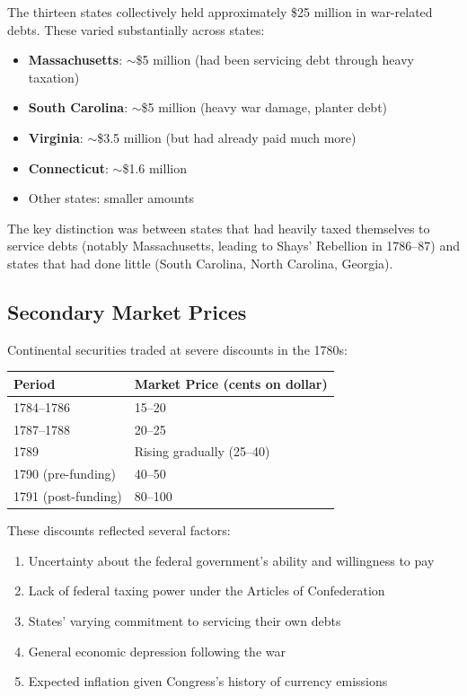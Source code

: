 \documentclass[12pt]{article}
\begin{document}
The thirteen states collectively held approximately \$25 million in war-related debts. These varied substantially across states:

\begin{itemize}
\item \textbf{Massachusetts}: $\sim$\$5 million (had been servicing debt through heavy taxation)
\item \textbf{South Carolina}: $\sim$\$5 million (heavy war damage, planter debt)
\item \textbf{Virginia}: $\sim$\$3.5 million (but had already paid much more)
\item \textbf{Connecticut}: $\sim$\$1.6 million
\item Other states: smaller amounts
\end{itemize}

The key distinction was between states that had heavily taxed themselves to service debts (notably Massachusetts, leading to Shays' Rebellion in 1786--87) and states that had done little (South Carolina, North Carolina, Georgia).

\subsection{Secondary Market Prices}

Continental securities traded at severe discounts in the 1780s:

\begin{center}
\begin{tabular}{ll}
\toprule
Period & Market Price (cents on dollar) \\
\midrule
1784--1786 & 15--20 \\
1787--1788 & 20--25 \\
1789 & Rising gradually (25--40) \\
1790 (pre-funding) & 40--50 \\
1791 (post-funding) & 80--100 \\
\bottomrule
\end{tabular}
\end{center}

These discounts reflected several factors:
\begin{enumerate}
\item Uncertainty about the federal government's ability and willingness to pay
\item Lack of federal taxing power under the Articles of Confederation
\item States' varying commitment to servicing their own debts  
\item General economic depression following the war
\item Expected inflation given Congress's history of currency emissions
\end{enumerate}
\end{document}
